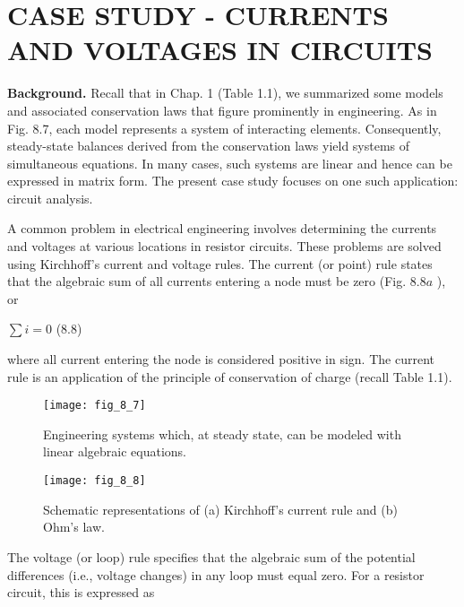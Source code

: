 \documentclass[../main.tex]{subfiles}
\begin{document}
\section{\textbf{CASE STUDY} - CURRENTS AND VOLTAGES IN CIRCUITS}
\label{sec:sec_8_3}

\textbf{Background.} Recall that in Chap. 1 (Table 1.1), we summarized some models and associated conservation laws that figure prominently in engineering. As in Fig. 8.7, each model represents a system of interacting elements. Consequently, steady-state balances derived from the conservation laws yield systems of simultaneous equations. In many cases, such systems are linear and hence can be expressed in matrix form. The present case study focuses on one such application: circuit analysis.

A common problem in electrical engineering involves determining the currents and voltages at various locations in resistor circuits. These problems are solved using Kirchhoff's current and voltage rules. The current (or point) rule states that the algebraic sum of all currents entering a node must be zero (Fig. $8.8 a$ ), or

\bigskip
$\sum i=0$ \hfill{(8.8)}
\bigskip

where all current entering the node is considered positive in sign. The current rule is an application of the principle of conservation of charge (recall Table 1.1).

\begin{multicols}{2}

    \begin{figure}[H]
        \centering
        \texttt{[image: fig\_8\_7]}
        \caption{\textsf{Engineering systems which, at steady state, can be modeled with linear algebraic
        equations.}}
        \label{fig:fig_8_7}
    \end{figure}
    
    \begin{figure}[H]
        \centering
        \texttt{[image: fig\_8\_8]}
        \caption{\textsf{Schematic representations
        of (a) Kirchhoff's current rule
        and (b) Ohm's law.}}
        \label{fig:fig_8_8}
    \end{figure}
    
\end{multicols}

\noindent The voltage (or loop) rule specifies that the algebraic sum of the potential differences (i.e., voltage changes) in any loop must equal zero. For a resistor circuit, this is expressed as
\end{document}
